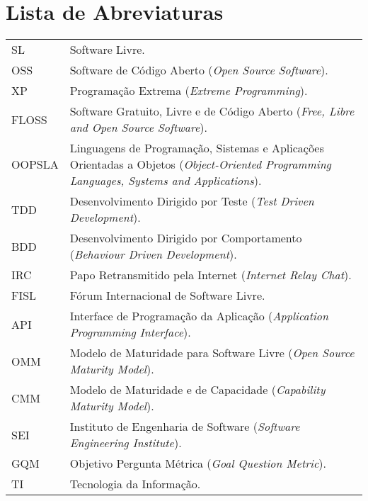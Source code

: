 \documentclass[11pt,twoside,a4paper]{book}
\begin{document}
\chapter{Lista de Abreviaturas}
\begin{tabular}{lp{14cm}}
  SL       & Software Livre.\\
  OSS         & Software de Código Aberto (\emph{Open Source
    Software}).\\
  XP       & Programação Extrema (\emph{Extreme Programming}).\\
  FLOSS       & Software Gratuito, Livre e de Código Aberto
  (\emph{Free, Libre and Open Source Software}).\\
  OOPSLA       & Linguagens de Programação, Sistemas e Aplicações
  Orientadas a Objetos (\emph{Object-Oriented Programming Languages, Systems and Applications}).\\
  TDD       & Desenvolvimento Dirigido por Teste
  (\emph{Test Driven Development}).\\
  BDD       & Desenvolvimento Dirigido por Comportamento
  (\emph{Behaviour Driven Development}).\\
  IRC       & Papo Retransmitido pela Internet (\emph{Internet Relay
    Chat}).\\
  FISL       & Fórum Internacional de Software Livre.\\
  API       & Interface de Programação da Aplicação (\emph{Application
    Programming Interface}).\\
  OMM       & Modelo de Maturidade para Software Livre (\emph{Open
    Source Maturity Model}).\\
  CMM       & Modelo de Maturidade e de Capacidade (\emph{Capability
    Maturity Model}).\\
  SEI       & Instituto de Engenharia de Software (\emph{Software
    Engineering Institute}).\\
  GQM       & Objetivo Pergunta Métrica (\emph{Goal Question Metric}).\\
  TI       & Tecnologia da Informação.\\
\end{tabular}

\end{document}
